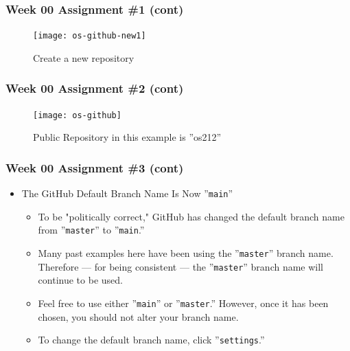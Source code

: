 \documentclass[xcolor=table, notheorems, hyperref={pdfpagelabels=false}]{beamer}
\begin{document}
\begin{frame}[fragile]
\frametitle{Week 00 Assignment \#1 (cont)}

\begin{figure}
\texttt{[image: os-github-new1]}
\caption{Create a new repository}
\end{figure}
\end{frame}

\begin{frame}[fragile]
\frametitle{Week 00 Assignment \#2 (cont)}

\begin{figure}
\texttt{[image: os-github]}
\caption{Public Repository in this example is ''os212''}
\end{figure}
\end{frame}

\begin{frame}[fragile]
\frametitle{Week 00 Assignment \#3 (cont)}
\begin{itemize}
\item The GitHub Default Branch Name Is Now ''\texttt{main}''
\begin{itemize}
\item To be "politically correct," GitHub has changed the default branch name
from ''\texttt{master}'' to ''\texttt{main}.''
\item Many past examples here have been using the ''\texttt{master}'' branch name.
      Therefore --- for being consistent --- the ''\texttt{master}'' branch name will continue to be used.
\item Feel free to use either ''\texttt{main}'' or ''\texttt{master}.'' 
      However, once it has been chosen, you should not alter your branch name.
\item To change the default branch name, click ''\texttt{settings}.''
\end{itemize}
\end{itemize}
\end{frame}

\end{document}
